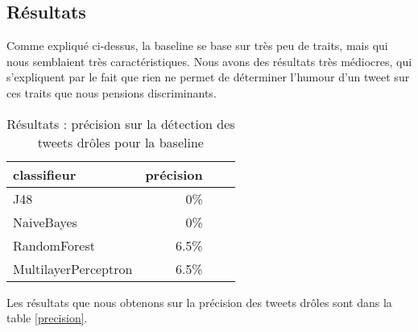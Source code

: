 \documentclass[10pt,a4paper,twoside]{article}
\begin{document}
\subsection{Résultats}
\label{res}

Comme expliqué ci-dessus, la baseline se base sur très peu de traits, mais qui nous semblaient très caractéristiques. Nous avons des résultats très médiocres, qui s'expliquent par le fait que rien ne permet de déterminer l'humour d'un tweet sur ces traits que nous pensions discriminants.
\begin{table}[!h]
\centering
	\begin{tabular}{lrrr}
	\toprule

	classifieur	& précision \\
	\midrule
	J48 & 0\% \\
	NaiveBayes & 0\% \\
	RandomForest & 6.5\% \\
	MultilayerPerceptron & 6.5\% \\

	\bottomrule
	\end{tabular}
\caption{Résultats : précision sur la détection des tweets drôles pour la baseline}
\end{table}

Les résultats que nous obtenons sur la précision des tweets drôles sont dans la table \ref{precision}.
\end{document}
